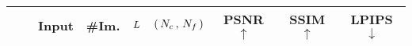 

\setlength{\tabcolsep}{4pt}
\begin{table}[t]
\centering
\begin{tabular}{@{\,}l@{\,\,}l|cccc|ccc@{\,}}
& & Input & \#Im. & $L$ & $(\,N_c\,, \,N_f\,)$ &  PSNR$\uparrow$ & SSIM$\uparrow$ & LPIPS$\downarrow$  \\
\hline

\end{tabular}
\end{table}
